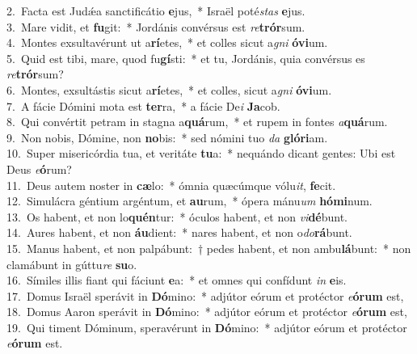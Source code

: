 {2.~}Facta est Judǽa sanctificátio \textbf{e}jus,~* Israël poté\textit{stas} \textbf{e}jus.\\
{3.~}Mare vidit, et \textbf{fu}git:~* Jordánis convérsus est \textit{re}\textbf{trór}sum.\\
{4.~}Montes exsultavérunt ut a\textbf{rí}etes,~* et colles sicut a\textit{gni} \textbf{ó}\textbf{vi}um.\\
{5.~}Quid est tibi, mare, quod fu\textbf{gí}sti:~* et tu, Jordánis, quia convérsus es \textit{re}\textbf{trór}sum?\\
{6.~}Montes, exsultástis sicut a\textbf{rí}etes,~* et colles, sicut a\textit{gni} \textbf{ó}\textbf{vi}um.\\
{7.~}A fácie Dómini mota est \textbf{ter}ra,~* a fácie De\textit{i} \textbf{Ja}cob.\\
{8.~}Qui convértit petram in stagna a\textbf{quá}rum,~* et rupem in fontes \textit{a}\textbf{quá}rum.\\
{9.~}Non nobis, Dómine, non \textbf{no}bis:~* sed nómini tuo \textit{da} \textbf{gló}\textbf{ri}am.\\
{10.~}Super misericórdia tua, et veritáte \textbf{tu}a:~* nequándo dicant gentes: Ubi est Deus \textit{e}\textbf{ó}rum?\\
{11.~}Deus autem noster in \textbf{cæ}lo:~* ómnia quæcúmque vólu\textit{it}, \textbf{fe}cit.\\
{12.~}Simulácra géntium argéntum, et \textbf{au}rum,~* ópera mánu\textit{um} \textbf{hó}\textbf{mi}num.\\
{13.~}Os habent, et non lo\textbf{quén}tur:~* óculos habent, et non \textit{vi}\textbf{dé}bunt.\\
{14.~}Aures habent, et non \textbf{áu}dient:~* nares habent, et non o\textit{do}\textbf{rá}bunt.\\
{15.~}Manus habent, et non palpábunt:~† pedes habent, et non ambu\textbf{lá}bunt:~* non clamábunt in gúttu\textit{re} \textbf{su}o.\\
{16.~}Símiles illis fiant qui fáciunt \textbf{e}a:~* et omnes qui confídunt \textit{in} \textbf{e}is.\\
{17.~}Domus Israël sperávit in \textbf{Dó}mino:~* adjútor eórum et protéctor \textit{e}\textbf{ó}\textbf{rum} est,\\
{18.~}Domus Aaron sperávit in \textbf{Dó}mino:~* adjútor eórum et protéctor \textit{e}\textbf{ó}\textbf{rum} est,\\
{19.~}Qui timent Dóminum, speravérunt in \textbf{Dó}mino:~* adjútor eórum et protéctor \textit{e}\textbf{ó}\textbf{rum} est.\\
